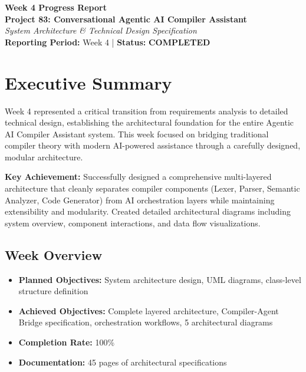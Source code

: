 \documentclass[a4paper,11pt]{article}
\newcommand{\statusgood}[1]{\colorbox{green!20}{\textbf{#1}}}
\begin{document}
\begin{center}
    {\huge \textbf{Week 4 Progress Report}} \\
    \vspace{3mm}
    {\large \textbf{Project 83: Conversational Agentic AI Compiler Assistant}} \\
    \vspace{2mm}
    \textit{System Architecture \& Technical Design Specification} \\
    \vspace{2mm}
    \textbf{Reporting Period:} Week 4 | \textbf{Status:} \statusgood{COMPLETED}
\end{center}

\vspace{5mm}

\section{Executive Summary}

Week 4 represented a critical transition from requirements analysis to detailed technical design, establishing the architectural foundation for the entire Agentic AI Compiler Assistant system. This week focused on bridging traditional compiler theory with modern AI-powered assistance through a carefully designed, modular architecture.

\textbf{Key Achievement:} Successfully designed a comprehensive multi-layered architecture that cleanly separates compiler components (Lexer, Parser, Semantic Analyzer, Code Generator) from AI orchestration layers while maintaining extensibility and modularity. Created detailed architectural diagrams including system overview, component interactions, and data flow visualizations.

\subsection{Week Overview}

\begin{itemize}[leftmargin=*]
    \item \textbf{Planned Objectives:} System architecture design, UML diagrams, class-level structure definition
    \item \textbf{Achieved Objectives:} Complete layered architecture, Compiler-Agent Bridge specification, orchestration workflows, 5 architectural diagrams
    \item \textbf{Completion Rate:} 100\%
    \item \textbf{Documentation:} 45 pages of architectural specifications
\end{itemize}
\end{document}
